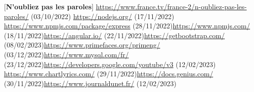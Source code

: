 \documentclass[12pt,french]{article}
\begin{document}
[\textbf{N'oubliez pas les paroles}] \href{https://www.france.tv/france-2/n-oubliez-pas-les-paroles/}{https://www.france.tv/france-2/n-oubliez-pas-les-paroles/} (03/10/2022) \newline{} \href{https://nodejs.org/}{https://nodejs.org/} (17/11/2022) \newline{} \href{https://www.npmjs.com/package/express}{https://www.npmjs.com/package/express} (28/11/2022)\newline{} \href{https://www.npmjs.com/}{https://www.npmjs.com/} (18/11/2022)\newline{} \href{https://angular.io/}{https://angular.io/} (22/11/2022)\newline{} \href{https://getbootstrap.com/}{https://getbootstrap.com/} (08/02/2023)\newline{} \href{https://www.primefaces.org/primeng/}{https://www.primefaces.org/primeng/} (03/12/2022)\newline{} \href{https://www.mysql.com/fr/}{https://www.mysql.com/fr/} (23/12/2022)\newline{} \href{https://developers.google.com/youtube/v3}{https://developers.google.com/youtube/v3} (12/02/2023) \newline{} \href{https://www.chartlyrics.com/}{https://www.chartlyrics.com/} (29/11/2022)\newline{} \href{https://docs.genius.com/}{https://docs.genius.com/} (30/11/2022)\newline{} \href{https://www.journaldunet.fr/}{https://www.journaldunet.fr/} (12/02/2023)\newline



\printglossary[type=main, title=Glossaire]
\end{document}
